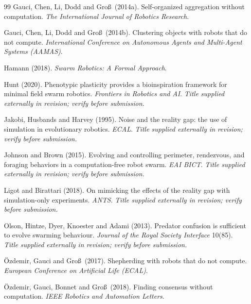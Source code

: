 \documentclass[11pt,a4paper]{article}
\begin{document}
\begin{thebibliography}{99}
Gauci, Chen, Li, Dodd and Gro\ss\ (2014a).
\newblock Self-organized aggregation without computation.
\newblock \emph{The International Journal of Robotics Research}.

Gauci, Chen, Li, Dodd and Gro\ss\ (2014b).
\newblock Clustering objects with robots that do not compute.
\newblock \emph{International Conference on Autonomous Agents and Multi-Agent
Systems (AAMAS)}.

Hamann (2018).
\newblock \emph{Swarm Robotics: A Formal Approach}.

Hunt (2020).
\newblock Phenotypic plasticity provides a bioinspiration framework for minimal
field swarm robotics.
\newblock \emph{Frontiers in Robotics and AI}.
\newblock \textit{Title supplied externally in revision; verify before submission.}

Jakobi, Husbands and Harvey (1995).
\newblock Noise and the reality gap: the use of simulation in evolutionary
robotics.
\newblock \emph{ECAL}.
\newblock \textit{Title supplied externally in revision; verify before submission.}

Johnson and Brown (2015).
\newblock Evolving and controlling perimeter, rendezvous, and foraging behaviors
in a computation-free robot swarm.
\newblock \emph{EAI BICT}.
\newblock \textit{Title supplied externally in revision; verify before submission.}

Ligot and Birattari (2018).
\newblock On mimicking the effects of the reality gap with simulation-only
experiments.
\newblock \emph{ANTS}.
\newblock \textit{Title supplied externally in revision; verify before submission.}

Olson, Hintze, Dyer, Knoester and Adami (2013).
\newblock Predator confusion is sufficient to evolve swarming behaviour.
\newblock \emph{Journal of the Royal Society Interface} 10(85).
\newblock \textit{Title supplied externally in revision; verify before submission.}

\"Ozdemir, Gauci and Gro\ss\ (2017).
\newblock Shepherding with robots that do not compute.
\newblock \emph{European Conference on Artificial Life (ECAL)}.

\"Ozdemir, Gauci, Bonnet and Gro\ss\ (2018).
\newblock Finding consensus without computation.
\newblock \emph{IEEE Robotics and Automation Letters}.


\end{thebibliography}
\end{document}
